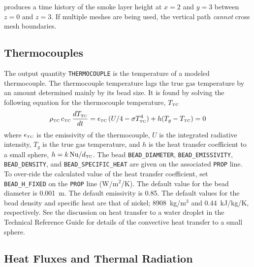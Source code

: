 \documentclass[11pt]{book}
\newcommand{\ct}{\tt\small}
\newcommand{\be}{\begin{equation}}
\newcommand{\ee}{\end{equation}}
\newcommand{\NU}{\hbox{Nu}}
\begin{document}
\noindent
produces a time history of the smoke layer height at $x=2$ and $y=3$ between $z=0$ and $z=3$.
If multiple meshes are being used, the vertical path {\em cannot} cross mesh boundaries.



\subsection{Thermocouples}
\label{info:THERMOCOUPLE}

The output quantity {\ct THERMOCOUPLE} is the temperature of a modeled thermocouple. The thermocouple temperature lags the true gas temperature by an amount determined mainly
by its bead size. It is found by solving the following equation for the thermocouple temperature, $T_{\hbox{\tiny TC}}$~\cite{Welsh:1}
\be
   \rho_{\hbox{\tiny TC}} \, c_{\hbox{\tiny TC}} \, \frac{dT_{\hbox{\tiny TC}}}{dt} = \epsilon_{\hbox{\tiny TC}} \, (U/4 - \sigma T_{\hbox{\tiny TC}}^4) + h(T_g - T_{\hbox{\tiny TC}}) = 0
   \label{TC}
\ee
where $\epsilon_{\hbox{\tiny TC}}$ is the emissivity of the thermocouple, $U$ is the integrated radiative intensity, $T_g$ is the true gas temperature, and
$h$ is the heat transfer coefficient to a small sphere,
$h=k \, \NU / d_{\hbox{\tiny TC}}$.
The bead {\ct BEAD\_DIAMETER}, {\ct BEAD\_EMISSIVITY}, {\ct BEAD\_DENSITY}, and {\ct BEAD\_SPECIFIC\_HEAT} are given on the associated {\ct PROP} line. To over-ride the
calculated value of the heat transfer coefficient, set {\ct BEAD\_H\_FIXED} on the {\ct PROP} line (W/m$^2$/K).
The default value for the bead diameter is 0.001~m. The default emissivity is 0.85. The default values for the bead density and specific heat are that of nickel; 8908~kg/m$^3$ and
0.44~kJ/kg/K, respectively.
See the discussion on heat transfer to a water
droplet in the Technical Reference Guide for details of the convective
heat transfer to a small sphere.


\subsection{Heat Fluxes and Thermal Radiation}
\label{info:heat_flux}
\end{document}
